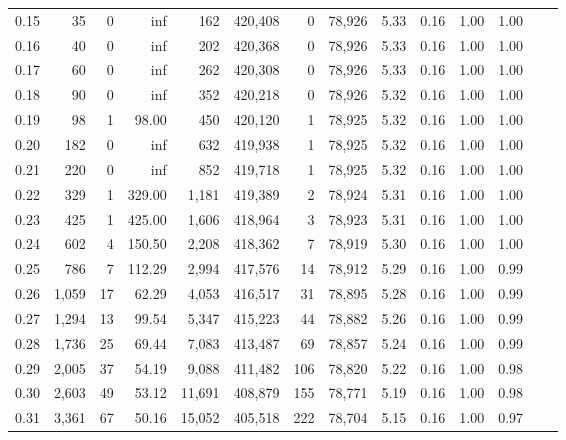 \begin{tabular}{rrrrrrrrrrrrrr}
0.15 &      35 &      0 &     inf &      162 &  420,408 &       0 &  78,926 &  5.33 &  0.16 &  1.00 &      1.00 \\
0.16 &      40 &      0 &     inf &      202 &  420,368 &       0 &  78,926 &  5.33 &  0.16 &  1.00 &      1.00 \\
0.17 &      60 &      0 &     inf &      262 &  420,308 &       0 &  78,926 &  5.33 &  0.16 &  1.00 &      1.00 \\
0.18 &      90 &      0 &     inf &      352 &  420,218 &       0 &  78,926 &  5.32 &  0.16 &  1.00 &      1.00 \\
0.19 &      98 &      1 &   98.00 &      450 &  420,120 &       1 &  78,925 &  5.32 &  0.16 &  1.00 &      1.00 \\
0.20 &     182 &      0 &     inf &      632 &  419,938 &       1 &  78,925 &  5.32 &  0.16 &  1.00 &      1.00 \\
0.21 &     220 &      0 &     inf &      852 &  419,718 &       1 &  78,925 &  5.32 &  0.16 &  1.00 &      1.00 \\
0.22 &     329 &      1 &  329.00 &    1,181 &  419,389 &       2 &  78,924 &  5.31 &  0.16 &  1.00 &      1.00 \\
0.23 &     425 &      1 &  425.00 &    1,606 &  418,964 &       3 &  78,923 &  5.31 &  0.16 &  1.00 &      1.00 \\
0.24 &     602 &      4 &  150.50 &    2,208 &  418,362 &       7 &  78,919 &  5.30 &  0.16 &  1.00 &      1.00 \\
0.25 &     786 &      7 &  112.29 &    2,994 &  417,576 &      14 &  78,912 &  5.29 &  0.16 &  1.00 &      0.99 \\
0.26 &   1,059 &     17 &   62.29 &    4,053 &  416,517 &      31 &  78,895 &  5.28 &  0.16 &  1.00 &      0.99 \\
0.27 &   1,294 &     13 &   99.54 &    5,347 &  415,223 &      44 &  78,882 &  5.26 &  0.16 &  1.00 &      0.99 \\
0.28 &   1,736 &     25 &   69.44 &    7,083 &  413,487 &      69 &  78,857 &  5.24 &  0.16 &  1.00 &      0.99 \\
0.29 &   2,005 &     37 &   54.19 &    9,088 &  411,482 &     106 &  78,820 &  5.22 &  0.16 &  1.00 &      0.98 \\
0.30 &   2,603 &     49 &   53.12 &   11,691 &  408,879 &     155 &  78,771 &  5.19 &  0.16 &  1.00 &      0.98 \\
0.31 &   3,361 &     67 &   50.16 &   15,052 &  405,518 &     222 &  78,704 &  5.15 &  0.16 &  1.00 &      0.97 \\

\end{tabular}
